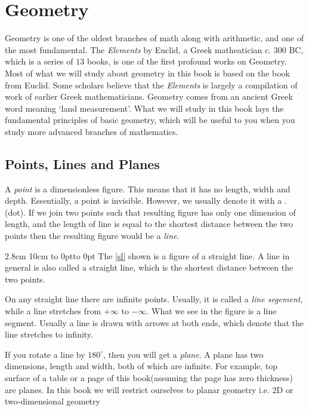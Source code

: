 \chapter{Geometry}

%


\color{black}Geometry is one of the oldest branches of math along with arithmetic, and one of the most
fundamental. The {\it Elements} by Euclid, a Greek matheatician c. $300$ BC, which is a series of $13$
books, is one of the first profound works on Geometry. Most of what we will study about geometry in this
book is based on the book from Euclid. Some scholars believe that the {\it Elements} is
largely a compilation of work of earlier Greek mathematicians. Geometry comes from an ancient Greek word
meaning `land measurement'. What we will study in this book lays the fundamental principles of basic
geometry, which will be useful to you when you study more advanced branches of mathematics.

\section{Points, Lines and Planes}

%

A {\it point} is a dimensionless figure. This means that it has no length, width and depth. Essentially, a
point is invisible. However, we usually denote it with a .(dot). If we join two points such that resulting
figure has only one dimension of length, and the length of line is equal to the shortest distance between
the two points then the resulting figure would be a {\it line}.

2.8cm 10cm
\hbox to 0pt{\vbox to 0pt{%
\vss}\hss}
\indent The \ref{sl} shown is a figure of a straight line. A line in general is also called a straight line,
which is the shortest distance between the two points.

On any straight line there are infinite points. Usually, it is called a {\it line segement}, while a line
stretches from $+\infty$ to $-\infty$. What we see in the figure is a line segment. Usually a line is drawn
with arrows at both ends, which denote that the line stretches to infinity.

If you rotate a line by $180^\circ$, then you will get a {\it plane}. A plane has two dimensions, length and
width, both of which are infinite. For example, top surface of a table or a page of this book(assuming the
page has zero thickness) are planes. In this book we will restrict ourselves to planar geometry i.e. $2$D or
two-dimensional geometry